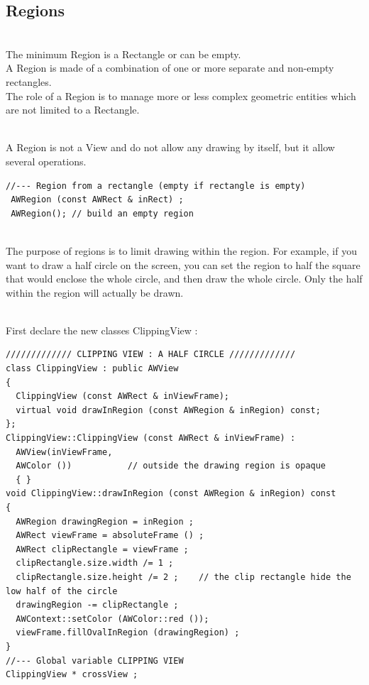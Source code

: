\documentclass[a4paper,11pt]{extarticle}
\begin{document}
\newpage
\subsection{Regions}

~\\ The minimum Region is a Rectangle or can be empty.
~\\ A Region is made of a combination of one or more separate and non-empty rectangles.
~\\ The role of a Region is to manage more or less complex geometric entities which are not limited to a Rectangle.

~\\ A Region is not a View and do not allow any drawing by itself, but it allow several operations.

\begin{lstlisting}[language=Arduinonl]
//--- Region from a rectangle (empty if rectangle is empty)
 AWRegion (const AWRect & inRect) ; 
 AWRegion(); // build an empty region
\end{lstlisting}
  
~\\ The purpose of regions is to limit drawing within the region. For example, if you want to draw a half circle on the screen, you can set the region to half the square that would enclose the whole circle, and then draw the whole circle. Only the half within the region will actually be drawn.

~\\ First declare the new classes  ClippingView :

\begin{lstlisting}[language=Arduinonl]
///////////// CLIPPING VIEW : A HALF CIRCLE /////////////
class ClippingView : public AWView
{
  ClippingView (const AWRect & inViewFrame);
  virtual void drawInRegion (const AWRegion & inRegion) const;
};
ClippingView::ClippingView (const AWRect & inViewFrame) :
  AWView(inViewFrame, 
  AWColor ())           // outside the drawing region is opaque 
  { }
void ClippingView::drawInRegion (const AWRegion & inRegion) const
{
  AWRegion drawingRegion = inRegion ;
  AWRect viewFrame = absoluteFrame () ;
  AWRect clipRectangle = viewFrame ;
  clipRectangle.size.width /= 1 ;
  clipRectangle.size.height /= 2 ;    // the clip rectangle hide the low half of the circle
  drawingRegion -= clipRectangle ;
  AWContext::setColor (AWColor::red ());
  viewFrame.fillOvalInRegion (drawingRegion) ;
}
//--- Global variable CLIPPING VIEW
ClippingView * crossView ;
\end{lstlisting}
\end{document}
